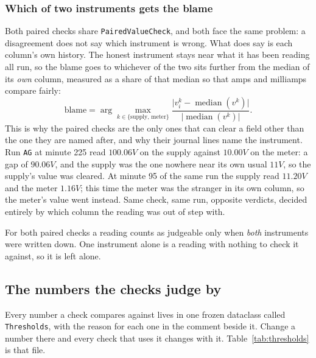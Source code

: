 \subsubsection*{Which of two instruments gets the blame}

Both paired checks share \texttt{PairedValueCheck}, and both face the same problem: a
disagreement does not say which instrument is wrong. What does say is each column's own
history. The honest instrument stays near what it has been reading all run, so the blame goes
to whichever of the two sits further from the median of its \emph{own} column, measured as a
share of that median so that amps and milliamps compare fairly:
\begin{equation}
  \label{eq:odd-one}
  \text{blame} = \arg\max_{k \in \{\text{supply},\,\text{meter}\}}
  \frac{\lvert v^k_i - \operatorname{median}(v^k) \rvert}{\lvert \operatorname{median}(v^k)\rvert}.
\end{equation}
This is why the paired checks are the only ones that can clear a field other than the one they
are named after, and why their journal lines name the instrument. Run \texttt{AG} at minute 225
read $100.06\unit{V}$ on the supply against $10.00\unit{V}$ on the meter: a gap of
$90.06\unit{V}$, and the supply was the one nowhere near its own usual $11\unit{V}$, so the
supply's value was cleared. At minute 95 of the same run the supply read $11.20\unit{V}$ and the
meter $1.16\unit{V}$; this time the meter was the stranger in its own column, so the meter's
value went instead. Same check, same run, opposite verdicts, decided entirely by which column
the reading was out of step with.

For both paired checks a reading counts as judgeable only when \emph{both} instruments were
written down. One instrument alone is a reading with nothing to check it against, so it is
left alone.

\subsection{The numbers the checks judge by}

Every number a check compares against lives in one frozen dataclass called
\texttt{Thresholds}, with the reason for each one in the comment beside it. Change a number
there and every check that uses it changes with it. Table~\ref{tab:thresholds} is that file.

